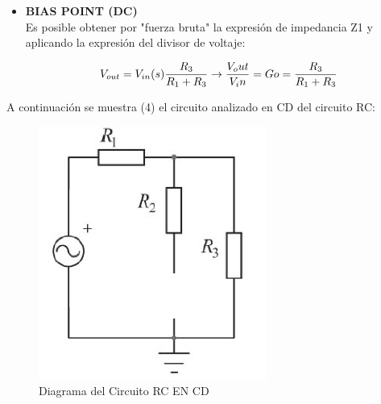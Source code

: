 \documentclass[letterpaper,10pt]{article}
\begin{document}
     \begin{itemize}
    	\item
    	\textbf{BIAS POINT (DC)}\vspace*{0.4in}\\
		Es posible obtener por "fuerza bruta" la expresión de impedancia Z1 y
		aplicando la expresión del divisor de voltaje:
		
   		\begin{equation}
		V_{out} = V_{in}(s) \frac {R_3}{R_1 + R_3}\rightarrow \frac {V_out}{V_in}= Go= \frac {R_3}{R_1 + R_3}\\  
		\end{equation}
     \end{itemize}

	\pagebreak
	A continuación se muestra (4) el circuito analizado en CD del circuito RC:
	\vspace*{0.3in}
    \begin{figure}[h!]
    	\centering
    	\includegraphics[scale=0.7]{CIRCUITORCDC}
    	\caption{Diagrama del Circuito RC EN CD}
    \end{figure}
\end{document}
